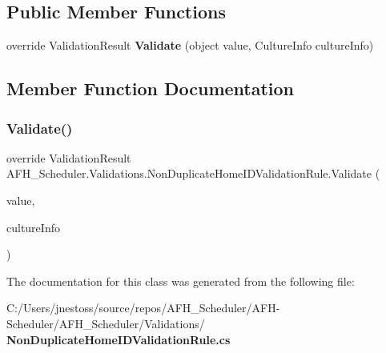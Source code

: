 \subsection*{Public Member Functions}
\begin{DoxyCompactItemize}
\item 
override Validation\+Result \textbf{ Validate} (object value, Culture\+Info culture\+Info)
\end{DoxyCompactItemize}


\subsection{Member Function Documentation}
\mbox{\label{class_a_f_h___scheduler_1_1_validations_1_1_non_duplicate_home_i_d_validation_rule_a86993a7c694f90fc22cd2029520053ad}} 
\subsubsection{Validate()}
{\footnotesize\ttfamily override Validation\+Result A\+F\+H\+\_\+\+Scheduler.\+Validations.\+Non\+Duplicate\+Home\+I\+D\+Validation\+Rule.\+Validate (\begin{DoxyParamCaption}\item[{object}]{value,  }\item[{Culture\+Info}]{culture\+Info }\end{DoxyParamCaption})}



The documentation for this class was generated from the following file\+:\begin{DoxyCompactItemize}
\item 
C\+:/\+Users/jnestoss/source/repos/\+A\+F\+H\+\_\+\+Scheduler/\+A\+F\+H-\/\+Scheduler/\+A\+F\+H\+\_\+\+Scheduler/\+Validations/\textbf{ Non\+Duplicate\+Home\+I\+D\+Validation\+Rule.\+cs}\end{DoxyCompactItemize}
